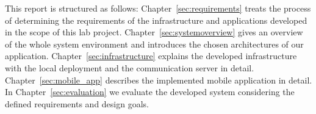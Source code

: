 This report is structured as follows:
Chapter~\ref{sec:requirements} treats the process of determining the requirements of the infrastructure and applications developed in the scope of this lab project.
Chapter~\ref{sec:systemoverview} gives an overview of the whole system environment and introduces the chosen architectures of our application.
Chapter~\ref{sec:infrastructure} explains the developed infrastructure with the local deployment and the communication server in detail.
Chapter~\ref{sec:mobile_app} describes the implemented mobile application in detail.
In Chapter~\ref{sec:evaluation} we evaluate the developed system considering the defined requirements and design goals.



